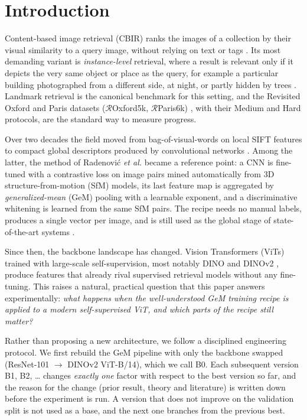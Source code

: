 \documentclass[runningheads]{llncs}
\newcommand{\roxf}{$\mathcal{R}$Oxford5k}
\newcommand{\rpar}{$\mathcal{R}$Paris6k}
\begin{document}
\section{Introduction}
\label{sec:intro}

Content-based image retrieval (CBIR) ranks the images of a collection by their
visual similarity to a query image, without relying on text or tags
\cite{smeulders2000cbir,srivastava2023cbir}. Its most demanding variant is
\emph{instance-level} retrieval, where a result is relevant only if it depicts
the very same object or place as the query, for example a particular
building photographed from a different side, at night, or partly hidden by
trees \cite{zheng2018sift,chen2023instance}. Landmark retrieval is the
canonical benchmark for this setting, and the Revisited Oxford and Paris
datasets (\roxf{}, \rpar) \cite{radenovic2018revisiting}, with their Medium
and Hard protocols, are the standard way to measure progress.

Over two decades the field moved from bag-of-visual-words on local SIFT
features \cite{sivic2003video,lowe2004sift,philbin2007oxford} to compact global
descriptors produced by convolutional networks
\cite{razavian2014cnn,babenko2014neural,babenko2015spoc,tolias2016rmac,gordo2017endtoend}.
Among the latter, the method of Radenovi{\'c} \emph{et al.}
\cite{radenovic2019gem} became a reference point: a CNN is fine-tuned with a
contrastive loss on image pairs mined automatically from 3D
structure-from-motion (SfM) models, its last feature map is aggregated by
\emph{generalized-mean} (GeM) pooling with a learnable exponent, and a
discriminative whitening is learned from the same SfM pairs. The recipe needs
no manual labels, produces a single vector per image, and is still used as the
global stage of state-of-the-art systems
\cite{cao2020delg,lee2022cvnet,shao2023superglobal}.

Since then, the backbone landscape has changed. Vision Transformers (ViTs)
\cite{dosovitskiy2021vit} trained with large-scale self-supervision, most
notably DINO \cite{caron2021dino} and DINOv2 \cite{oquab2024dinov2}, produce
features that already rival supervised retrieval models without any
fine-tuning. This raises a natural, practical question that this paper
answers experimentally: \emph{what happens when the well-understood GeM
training recipe is applied to a modern self-supervised ViT, and which parts of
the recipe still matter?}

Rather than proposing a new architecture, we follow a disciplined engineering
protocol. We first rebuild the GeM pipeline with only the backbone swapped
(ResNet-101 $\rightarrow$ DINOv2 ViT-B/14), which we call B0. Each subsequent
version B1, B2, \dots{} changes \emph{exactly one} factor with respect to the
best version so far, and the reason for the change (prior result, theory and
literature) is written down before the experiment is run. A version that does
not improve on the validation split is not used as a base, and the next one
branches from the previous best.
\end{document}
